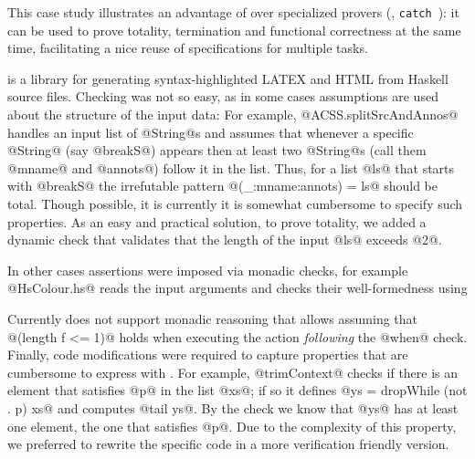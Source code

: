 This case study illustrates an advantage of \toolname over specialized provers 
(\eg, \texttt{catch}~\citep{catch}): it can be used to prove totality, termination and
functional correctness at the same time, facilitating a nice reuse of
specifications for multiple tasks.

\mypara{\lbhscolour} is a library for generating syntax-highlighted LATEX and HTML from
Haskell source files.
Checking \lbhscolour was not so easy, as in some cases assumptions are used about the 
structure of the input data:
%
For example, @ACSS.splitSrcAndAnnos@ handles an
input list of @String@s and assumes that whenever
a specific @String@ (say @breakS@) appears then 
at least two @String@s (call them @mname@ and @annots@)
follow it in the list.
Thus, for a list @ls@ that starts with @breakS@ 
the irrefutable pattern  @(_:mname:annots) = ls@
should be total.
%
Though possible, it is currently it is somewhat cumbersome to specify such 
properties. 
%
As an easy and practical solution, 
to prove totality, we added a dynamic check that 
validates that the length of the input @ls@ exceeds @2@.


In other cases assertions were imposed via monadic checks, 
for example @HsColour.hs@ reads the input arguments and 
checks their well-formedness using 
%
%
Currently \toolname does not support monadic reasoning that 
allows assuming that @(length f <= 1)@
holds when executing the action \emph{following} the @when@ check. 
%
Finally, code modifications were required to capture properties 
that are cumbersome to express with \toolname.
%
For example, @trimContext@ checks if there is an element that 
satisfies @p@ in the list @xs@; if so it defines 
%
@ys = dropWhile (not . p) xs@
%
and computes @tail ys@.
%
By the check we know that @ys@ has at least one element, the 
one that satisfies @p@. 
%
Due to the complexity of this property, we preferred to rewrite the specific code 
in a more verification friendly version. 


